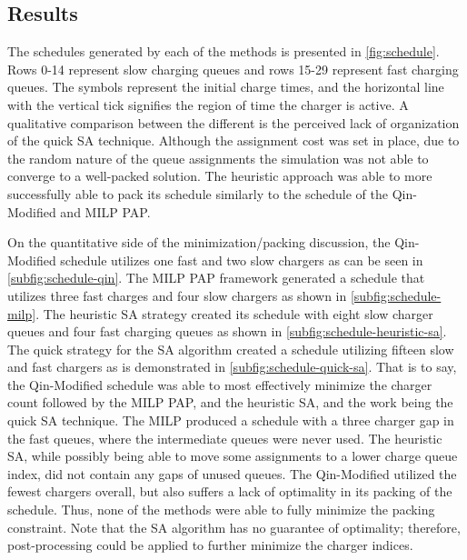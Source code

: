\documentclass[ee,thesis]{usuthesis}
\begin{document}
\subsection{Results}
\label{sec:results}
The schedules generated by each of the methods is presented in \ref{fig:schedule}. Rows 0-14 represent slow charging
queues and rows 15-29 represent fast charging queues. The symbols represent the initial charge times, and the horizontal
line with the vertical tick signifies the region of time the charger is active. A qualitative comparison between the
different is the perceived lack of organization of the quick SA technique. Although the assignment cost was set in
place, due to the random nature of the queue assignments the simulation was not able to converge to a well-packed
solution. The heuristic approach was able to more successfully able to pack its schedule similarly to the schedule of
the Qin-Modified and MILP PAP.

On the quantitative side of the minimization/packing discussion, the Qin-Modified schedule utilizes one fast and two
slow chargers as can be seen in \ref{subfig:schedule-qin}. The MILP PAP framework generated a schedule that utilizes
three fast charges and four slow chargers as shown in \ref{subfig:schedule-milp}. The heuristic SA strategy created its
schedule with eight slow charger queues and four fast charging queues as shown in \ref{subfig:schedule-heuristic-sa}.
The quick strategy for the SA algorithm created a schedule utilizing fifteen slow and fast chargers as is demonstrated
in \ref{subfig:schedule-quick-sa}. That is to say, the Qin-Modified schedule was able to most effectively minimize the
charger count followed by the MILP PAP, and the heuristic SA, and the work being the quick SA technique. The MILP
produced a schedule with a three charger gap in the fast queues, where the intermediate queues were never used. The
heuristic SA, while possibly being able to move some assignments to a lower charge queue index, did not contain any gaps
of unused queues. The Qin-Modified utilized the fewest chargers overall, but also suffers a lack of optimality in its
packing of the schedule. Thus, none of the methods were able to fully minimize the packing constraint. Note that the SA
algorithm has no guarantee of optimality; therefore, post-processing could be applied to further minimize the charger
indices.
\end{document}
